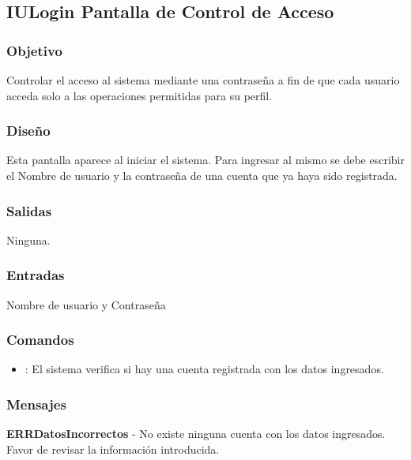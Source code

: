 \subsection{IULogin Pantalla de Control de Acceso}

\subsubsection{Objetivo}
	Controlar el acceso al sistema mediante una contraseña a fin de que cada usuario acceda solo a las operaciones permitidas para su perfil.

\subsubsection{Diseño}
	Esta pantalla aparece al iniciar el sistema. Para ingresar al mismo se debe escribir el Nombre de usuario y la contraseña de una cuenta que ya haya sido registrada.


\subsubsection{Salidas}

	Ninguna.

\subsubsection{Entradas}
Nombre de usuario y Contraseña

\subsubsection{Comandos}
\begin{itemize}
		\item {}: El sistema verifica si hay una cuenta registrada con los datos ingresados.
\end{itemize}

\subsubsection{Mensajes}
	\begin{Citemize}
		\item {\bf ERRDatosIncorrectos} - No existe ninguna cuenta con los datos ingresados. Favor de revisar la informaci\'on introducida.
	\end{Citemize}